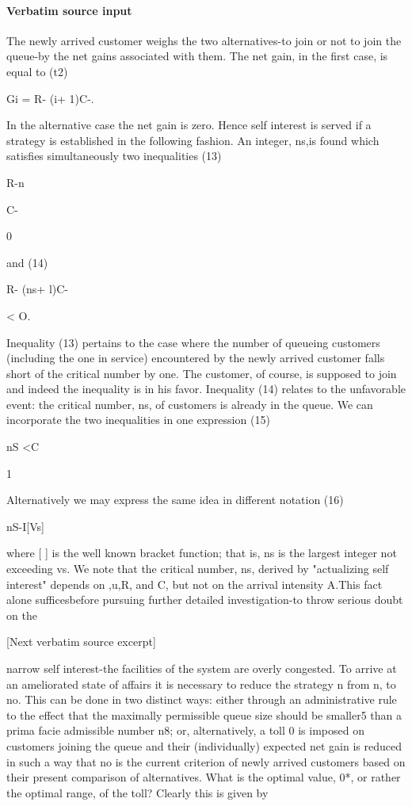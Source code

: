 \documentclass[10pt]{article}
\begin{document}
\paragraph{Verbatim source input}
\begin{ReviewVerbatim}
The newly arrived customer weighs the two alternatives-to join or not to join
the queue-by the net gains associated with them. The net gain, in the first case,
is equal to
(t2)

Gi = R- (i+ 1)C-.

In the alternative case the net gain is zero. Hence self interest is served if a strategy
is established in the following fashion. An integer, ns,is found which satisfies simultaneously two inequalities
(13)

R-n

C-

0

and
(14)

R- (ns+ l)C-

< O.

Inequality (13) pertains to the case where the number of queueing customers
(including the one in service) encountered by the newly arrived customer falls
short of the critical number by one. The customer, of course, is supposed to join
and indeed the inequality is in his favor. Inequality (14) relates to the unfavorable
event: the critical number, ns, of customers is already in the queue. We can incorporate the two inequalities in one expression
(15)

nS <C

1

Alternatively we may express the same idea in different notation
(16)

nS-I[Vs]

where [ ] is the well known bracket function; that is, ns is the largest integer not
exceeding vs.
We note that the critical number, ns, derived by "actualizing self interest" depends on ,u,R, and C, but not on the arrival intensity A.This fact alone sufficesbefore pursuing further detailed investigation-to throw serious doubt on the

[Next verbatim source excerpt]

narrow self interest-the facilities of the system are overly congested. To arrive at
an ameliorated state of affairs it is necessary to reduce the strategy n from n, to no.
This can be done in two distinct ways: either through an administrative rule to
the effect that the maximally permissible queue size should be smaller5 than a
prima facie admissible number n8; or, alternatively, a toll 0 is imposed on customers
joining the queue and their (individually) expected net gain is reduced in such a way
that no is the current criterion of newly arrived customers based on their present
comparison of alternatives.
What is the optimal value, 0*, or rather the optimal range, of the toll? Clearly
this is given by


\end{ReviewVerbatim}
\end{document}
